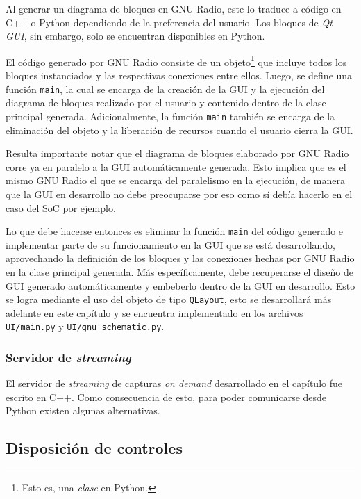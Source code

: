 \documentclass[../../main.tex]{subfiles}
\begin{document}
Al generar un diagrama de bloques en GNU Radio, este lo traduce a código en C++ o Python dependiendo de la preferencia del usuario. Los bloques de \textit{Qt GUI}, sin embargo, solo se encuentran disponibles en Python. 

El código generado por GNU Radio consiste de un objeto\footnote{Esto es, una \textit{clase} en Python.} que incluye todos los bloques instanciados y las respectivas conexiones entre ellos. Luego, se define una función \texttt{main}, la cual se encarga de la creación de la GUI y la ejecución del diagrama de bloques realizado por el usuario y contenido dentro de la clase principal generada. Adicionalmente, la función \texttt{main} también se encarga de la eliminación del objeto y la liberación de recursos cuando el usuario cierra la GUI.

Resulta importante notar que el diagrama de bloques elaborado por GNU Radio corre ya en paralelo a la GUI automáticamente generada. Esto implica que es el mismo GNU Radio el que se encarga del paralelismo en la ejecución, de manera que la GUI en desarrollo no debe preocuparse por eso como sí debía hacerlo en el caso del SoC por ejemplo.

Lo que debe hacerse entonces es eliminar la función \texttt{main} del código generado e implementar parte de su funcionamiento en la GUI que se está desarrollando, aprovechando la definición de los bloques y las conexiones hechas por GNU Radio en la clase principal generada. 
Más específicamente, debe recuperarse el diseño de GUI generado automáticamente y embeberlo dentro de la GUI en desarrollo. Esto se logra mediante el uso del objeto de tipo \texttt{QLayout}, esto se desarrollará más adelante en este capítulo y se encuentra implementado en los archivos \texttt{UI/main.py} y \texttt{UI/gnu\_schematic.py}.  

\subsubsection{Servidor de \textit{streaming}}
El servidor de \textit{streaming} de capturas \textit{on demand} desarrollado en el capítulo  fue escrito en C++. Como consecuencia de esto, para poder comunicarse desde Python existen algunas alternativas. 


\subsection{Disposición de controles}
\end{document}

